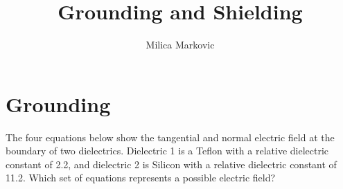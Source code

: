 \documentclass{ximera}
\title{Grounding and Shielding}
\author{Milica Markovic}
\begin{document}
  
\begin{abstract}  

\end{abstract}  
\maketitle    


\section{Grounding}



   \begin{question}
 The four equations below show the tangential and normal electric field at the boundary of two dielectrics. Dielectric 1 is a Teflon with a relative dielectric constant of 2.2, and dielectric 2 is Silicon with a relative dielectric constant of 11.2. Which set of equations represents a possible electric field? 
   \begin{multipleChoice}
   \end{multipleChoice}
   \end{question}
   
\end{document}
